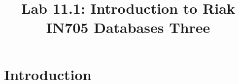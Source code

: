\documentclass{article}
\begin{document}
\title{Lab 11.1: Introduction to Riak\\ IN705 Databases Three}
\date{}
\maketitle

\section*{Introduction}
\end{document}
